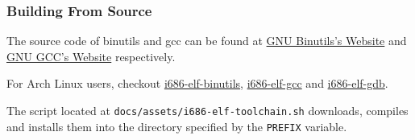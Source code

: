 \subsubsection{Building From Source}

The source code of binutils and gcc can be found at \href{https://www.gnu.org/software/binutils}{GNU Binutils's Website}
and \href{https://gcc.gnu.org}{GNU GCC's Website} respectively.

\begin{note}
    \item For Arch Linux users, checkout
    \href{https://github.com/moodyhunter/repo/blob/main/moody/i686-elf-binutils/PKGBUILD}{i686-elf-binutils},
    \href{https://github.com/moodyhunter/repo/blob/main/moody/i686-elf-gcc/PKGBUILD}{i686-elf-gcc} and
    \href{https://github.com/moodyhunter/repo/blob/main/moody/i686-elf-gdb/PKGBUILD}{i686-elf-gdb}.
\end{note}

The script located at \texttt{docs/assets/i686-elf-toolchain.sh} downloads, compiles and installs them into the
directory specified by the \texttt{PREFIX} variable.
